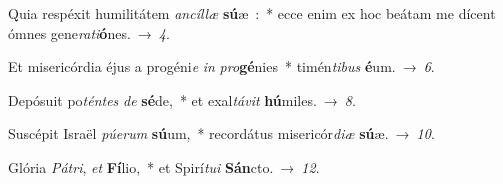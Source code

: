﻿\item Quia respéxit humilitátem \emph{an}\-\emph{cíl}\-\emph{læ} \textbf{sú}æ~:~*
ecce enim ex hoc beátam me dícent ómnes gene\emph{ra}\emph{ti}\textbf{ó}nes.~→~\emph{4}.
\item Et misericórdia éjus a progéni\emph{e} \emph{in} \emph{pro}\textbf{gé}nies~*
timén\emph{ti}\-\emph{bus} \textbf{é}um.~→~\emph{6}.
\item Depósuit po\emph{tén}\-\emph{tes} \emph{de} \textbf{sé}de,~*
et exal\emph{tá}\-\emph{vit} \textbf{hú}miles.~→~\emph{8}.
\item Suscépit Israël \emph{pú}\-\emph{e}\-\emph{rum} \textbf{sú}um,~*
recordátus misericór\emph{di}\-\emph{æ} \textbf{sú}æ.~→~\emph{10}.
\item Glória \emph{Pá}\-\emph{tri}, \emph{et} \textbf{Fí}lio,~*
et Spirí\emph{tu}\-\emph{i} \textbf{Sán}cto.~→~\emph{12}.
